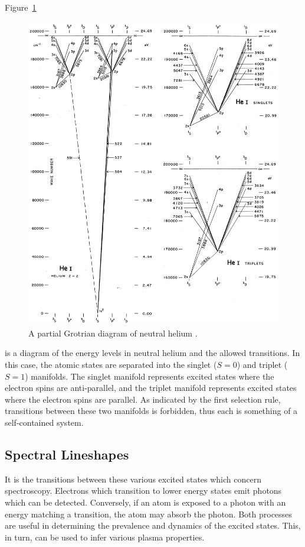 Figure~\ref{fig:grotrian}
\begin{figure}
  \centering
  \includegraphics{./chapters/theory/figures/grotrian.pdf}
  \caption{A partial Grotrian diagram of neutral helium \cite{Moore1968}.}
  \label{fig:grotrian}
\end{figure}
is a diagram of the energy levels in neutral helium and the allowed transitions.
In this case, the atomic states are separated into the singlet ($S=0$) and
triplet ($S = 1$) manifolds. The singlet manifold represents excited states
where the electron spins are anti-parallel, and the triplet manifold represents
excited states where the electron spins are parallel. As indicated by the first
selection rule, transitions between these two manifolds is forbidden, thus each
is something of a self-contained system.

\subsection{Spectral Lineshapes}

It is the transitions between these various excited states which concern
spectroscopy. Electrons which transition to lower energy states emit photons
which can be detected. Conversely, if an atom is exposed to a photon with an
energy matching a transition, the atom may absorb the photon. Both processes are
useful in determining the prevalence and dynamics of the excited states. This,
in turn, can be used to infer various plasma properties.

